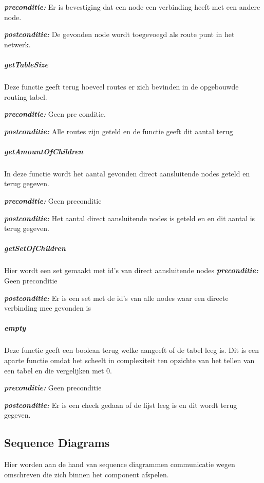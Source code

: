 \documentclass[a4paper, 11pt, oneside]{report}
\begin{document}
\textbf{\textit{preconditie:}}  Er is bevestiging dat een node een verbinding heeft met een andere node.

\textbf{\textit{postconditie:}}  De gevonden node wordt toegevoegd als route punt in het netwerk.


\subparagraph{getTableSize}
Deze functie geeft terug hoeveel routes er zich bevinden in de opgebouwde routing tabel.

\textbf{\textit{preconditie:}} Geen pre conditie.

\textbf{\textit{postconditie:}} Alle routes zijn geteld en de functie geeft dit aantal terug

\subparagraph{getAmountOfChildren}
In deze functie wordt het aantal gevonden direct aansluitende nodes geteld en terug gegeven.  

\textbf{\textit{preconditie:}}  Geen preconditie

\textbf{\textit{postconditie:}} Het aantal direct aansluitende nodes is geteld en en dit aantal is terug gegeven.

\subparagraph{getSetOfChildren}
Hier wordt een set gemaakt met id's van direct aansluitende nodes 
\textbf{\textit{preconditie:}} Geen preconditie

\textbf{\textit{postconditie:}} Er is een set met de id's van alle nodes waar een directe verbinding mee gevonden is

\subparagraph{empty}
Deze functie geeft een boolean terug welke aangeeft of de tabel leeg is.
Dit is een aparte functie omdat het scheelt in complexiteit ten opzichte van het tellen van een tabel en die vergelijken met 0.
  
\textbf{\textit{preconditie:}} Geen preconditie

\textbf{\textit{postconditie:}} Er is een check gedaan of de lijst leeg is en dit wordt terug gegeven.

\subsection{Sequence Diagrams}
\label{DetailedDesign:Communicatie:sequence}
Hier worden aan de hand van sequence diagrammen communicatie wegen omschreven die zich binnen het component afspelen.
\end{document}
